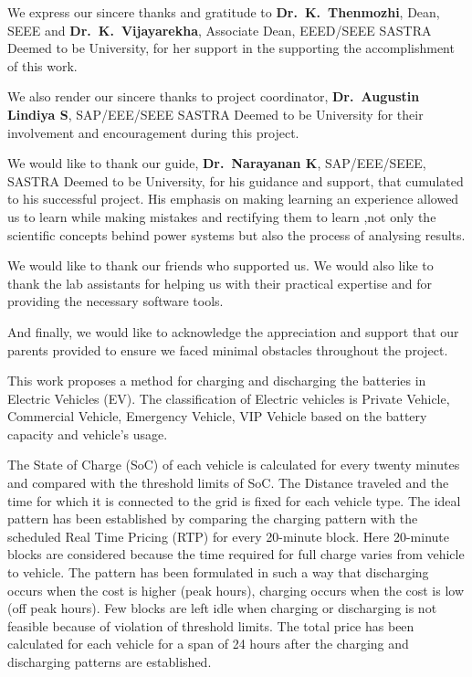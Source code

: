 \documentclass[a4paper, 12pt, oneside]{sastra}
\begin{document}
	\par We express our sincere thanks and gratitude to \textbf{Dr.~K.~Thenmozhi}, Dean, SEEE and \textbf{Dr.~K.~Vijayarekha}, Associate Dean, EEED/SEEE SASTRA Deemed to be University, for her support in the supporting the accomplishment of this work.
	
	\par We also render our sincere thanks to project coordinator, \textbf{Dr.~Augustin Lindiya S}, SAP/EEE/SEEE SASTRA Deemed to be University for their involvement and encouragement during this project.
	
	\par We would like to thank our guide, \textbf{Dr.~Narayanan K}, SAP/EEE/SEEE, SASTRA Deemed to be University, for his guidance and support, that cumulated to his successful project. His emphasis on making learning an experience allowed us to learn while making mistakes and rectifying them to learn ,not only the scientific concepts behind power systems but also the process of analysing results.
	
	\par We would like to thank our friends who supported us. We would also like to thank the lab assistants for helping us with their practical expertise and for providing the necessary software tools.
	
	\par And finally, we would like to acknowledge the appreciation and support that our parents provided to ensure we faced minimal obstacles throughout the project.
	\pagebreak
	
	\abstract
	
	
	\vspace*{24pt}
	
	\noindent This work proposes a method for charging and discharging the batteries in Electric Vehicles (EV). The classification of Electric vehicles is Private Vehicle, Commercial Vehicle, Emergency Vehicle, VIP Vehicle based on the battery capacity and vehicle's usage.
	
	\noindent The State of Charge (SoC) of each vehicle is calculated for every twenty minutes and compared with the threshold limits of SoC. The Distance traveled and the time for which it is connected to the grid is fixed for each vehicle type. The ideal pattern has been established by comparing the charging pattern with the scheduled Real Time Pricing (RTP) for every 20-minute block. Here 20-minute blocks are considered because the time required for full charge varies from vehicle to vehicle. The pattern has been formulated in such a way that discharging occurs when the cost is higher (peak hours), charging occurs when the cost is low (off peak hours). Few blocks are left idle when charging or discharging is not feasible because of violation of threshold limits. The total price has been calculated for each vehicle for a span of 24 hours after the charging and discharging patterns are established.
	
\end{document}
